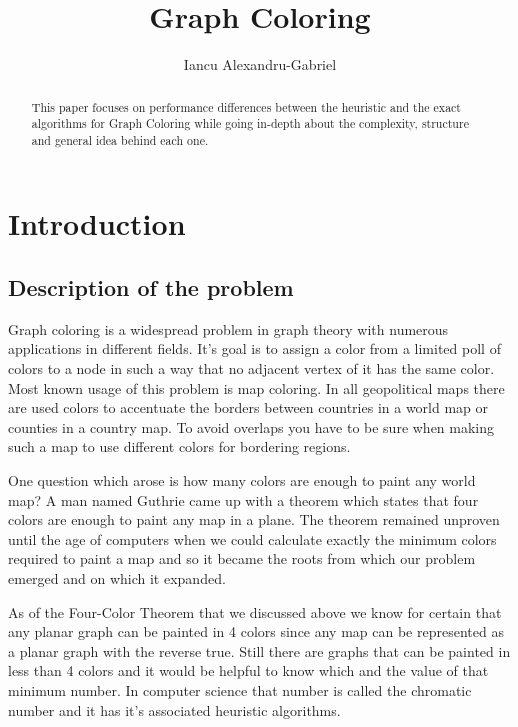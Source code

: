 \documentclass[runningheads]{llncs}
\begin{document}
	
\title{Graph Coloring}
\author{Iancu Alexandru-Gabriel}


\maketitle
\begin{abstract}
This paper focuses on performance differences between the heuristic and the exact
algorithms for Graph Coloring while going in-depth about the complexity, structure
and general idea behind each one.

\end{abstract}

\section{Introduction}
\subsection{Description of the problem}
Graph coloring is a widespread problem in graph theory with
numerous applications in different fields. It's goal is to assign a color from
a limited poll of colors to a node in such a way that no adjacent vertex of it has the
same color. Most known usage of this problem is map coloring. In all geopolitical maps
there are used colors to accentuate the borders between countries in a world map or counties
in a country map. To avoid overlaps you have to be sure when making such a map to use different
colors for bordering regions.\cite{ref_url5}

One question which arose is how many colors are enough
to paint any world map? A man named Guthrie came up with a theorem which states that four colors
are enough to paint any map in a plane. The theorem remained unproven until the age of computers
when we could calculate exactly the minimum colors required to paint a map and so it became
the roots from which our problem emerged and on which it expanded.\cite{ref_url7}

As of the Four-Color Theorem that we discussed above we know for certain that any planar graph can 
be painted in 4 colors since any map can be represented as a planar graph with the reverse true.\cite{ref_url6} Still
there are graphs that can be painted in less than 4 colors and it would be helpful to know which and
the value of that minimum number. In computer science that number is called the chromatic number and it
has it's associated heuristic algorithms.
\end{document}
